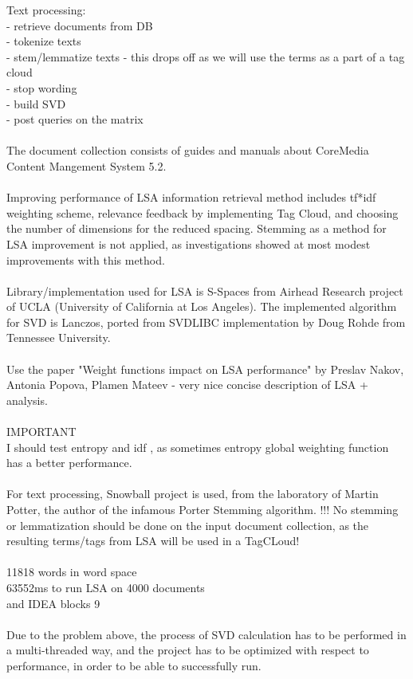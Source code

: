 Text processing:\\
-	retrieve documents from DB\\
-	tokenize texts\\
-	stem/lemmatize texts - this drops off as we will use the terms as a part of a tag cloud\\
-	stop wording\\
-	build SVD\\
-	post queries on the matrix\\
\\
The document collection consists of guides and manuals about CoreMedia Content Mangement System 5.2.\\
\\
Improving performance of LSA information retrieval method includes tf*idf weighting scheme, relevance feedback by implementing Tag Cloud, and choosing the number of dimensions for the reduced spacing. Stemming as a method for LSA improvement is not applied, as investigations showed at most modest improvements with this method.\\
\\
Library/implementation used for LSA is S-Spaces from Airhead Research project of UCLA (University of California at Los Angeles). The implemented algorithm for SVD is Lanczos, ported from SVDLIBC implementation by Doug Rohde from Tennessee University.\\
\\
Use the paper "Weight functions impact on LSA performance" by Preslav Nakov, Antonia Popova, Plamen Mateev - very nice concise description of LSA + analysis.\\
\\
IMPORTANT\\
I should test entropy and idf , as sometimes entropy global weighting function has a better performance.\\ 
\\
For text processing, Snowball project is used, from the laboratory of Martin Potter, the author of the infamous Porter Stemming algorithm.
!!! No stemming or lemmatization should be done on the input document collection, as the resulting terms/tags from LSA will be used in a TagCLoud!\\
\\

11818 words in word space\\
 63552ms to run LSA on 4000 documents\\
and IDEA blocks 9\\
\\
Due to the problem above, the process of SVD calculation has to be performed in a multi-threaded way, and the project has to be optimized with respect to performance, in order to be able to successfully run.

